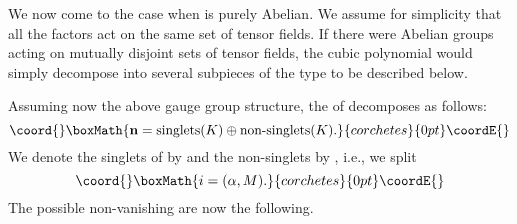 \documentclass[a4paper,11pt]{article}
\begin{document}
\subsubsection{\coordHE{}}

We now come to the case when \coordHE{} is purely Abelian.  We assume
for simplicity that all the \coordHE{} factors act on the same set of tensor
fields. If there were Abelian groups acting on mutually disjoint sets of
tensor fields, the cubic polynomial would simply decompose into several
subpieces of the type to be described below. 

Assuming now the above gauge group structure,
the \coordHE{} of \coordHE{} decomposes as follows:
\begin{displaymath}\coord{}\boxMath{
    \mathbf{n}=\textrm{singlets}(K)\oplus
    \textrm{non-singlets}(K).
}{corchetes}{0pt}\coordE{}\end{displaymath}
We denote the singlets of \coordHE{} by \coordHE{} and
the non-singlets by \coordHE{}, i.e., we split
\begin{displaymath}\coord{}\boxMath{
    i=(\alpha,M).
}{corchetes}{0pt}\coordE{}\end{displaymath}
The possible non-vanishing \coordHE{} are now the following.
\end{document}
